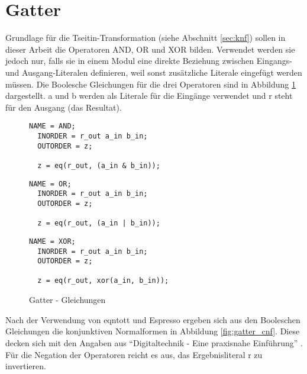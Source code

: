 \section{Gatter}
\label{sec:knf:gatter}

Grundlage für die Tseitin-Transformation (siehe Abschnitt \ref{sec:knf}) sollen in dieser Arbeit die Operatoren AND, OR und XOR bilden. Verwendet werden sie jedoch
nur, falls sie in einem Modul eine direkte Beziehung zwischen Eingangs- und Ausgang-Literalen definieren, weil sonst zusätzliche Literale eingefügt werden müssen.
Die Boolesche Gleichungen für die drei Operatoren sind in Abbildung \ref{fig:gatter_equations} dargestellt. a und b werden als Literale für die Eingänge verwendet
und r steht für den Ausgang (das Resultat).

\begin{figure}[!h]
  \centering
  \begin{minipage}[c]{4.85cm}
    \begin{lstlisting}[]
  NAME = AND;
  INORDER = r_out a_in b_in;
  OUTORDER = z;

  z = eq(r_out, (a_in & b_in));
    \end{lstlisting}
  \end{minipage}
  \begin{minipage}[c]{4.85cm}
    \begin{lstlisting}[]
  NAME = OR;
  INORDER = r_out a_in b_in;
  OUTORDER = z;

  z = eq(r_out, (a_in | b_in));
    \end{lstlisting}
  \end{minipage}
  \begin{minipage}[c]{5.1cm}
    \begin{lstlisting}[]
  NAME = XOR;
  INORDER = r_out a_in b_in;
  OUTORDER = z;

  z = eq(r_out, xor(a_in, b_in));
    \end{lstlisting}
  \end{minipage}
  \caption{Gatter - Gleichungen}
  \label{fig:gatter_equations}
\end{figure}

Nach der Verwendung von eqntott und Espresso ergeben sich aus den Booleschen Gleichungen die konjunktiven Normalformen in Abbildung \ref{fig:gatter_cnf}.
Diese decken sich mit den Angaben aus "`Digitaltechnik - Eine praxisnahe Einführung"' \cite[164]{digitaltechnik}. Für die Negation der Operatoren reicht es aus, das Ergebnisliteral r zu invertieren.

